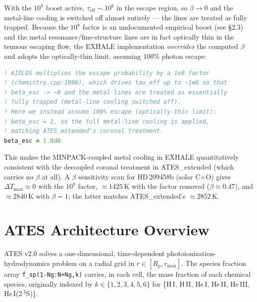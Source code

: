 \documentclass[english,a4paper]{my_memo}
\begin{document}
With the \(10^{8}\) boost active, \(\tau_\mathrm{eff}\sim 10^{6}\) in the
escape region, so \(\beta\to 0\) and the metal-line cooling is switched
off almost entirely --- the lines are treated as fully trapped.  Because
the \(10^{8}\) factor is an undocumented empirical boost (see \S2.3) and
the metal resonance/fine-structure lines are in fact optically thin in
the tenuous escaping flow, the EXHALE implementation
\emph{overrides} the computed \(\beta\) and adopts the optically-thin
limit, assuming 100\% photon escape:
\begin{lstlisting}[language=Fortran]
! AIOLOS multiplies the escape probability by a 1e8 factor
! (chemistry.cpp:1006), which drives tau_eff up to ~1e6 so that
! beta_esc -> ~0 and the metal lines are treated as essentially
! fully trapped (metal-line cooling switched off).
! Here we instead assume 100% escape (optically-thin limit):
! beta_esc = 1, so the full metal-line cooling is applied,
! matching ATES_extended's coronal treatment.
beta_esc = 1.0d0
\end{lstlisting}
This makes the MINPACK-coupled metal cooling in EXHALE
quantitatively consistent with the decoupled coronal treatment in
ATES\_extended (which carries no \(\beta\) at all).  A \(\beta\)
sensitivity scan for HD\,209458b (solar C+O) gives
\(\Delta T_\mathrm{max}\approx 0\) with the \(10^{8}\) factor,
\(\approx 1425\)\,K with the factor removed (\(\beta\approx 0.47\)), and
\(\approx 2840\)\,K with \(\beta = 1\); the latter matches
ATES\_extended's \(\approx 2852\)\,K.

\section{ATES Architecture Overview}

ATES v2.0 solves a one-dimensional, time-dependent
photoionization-hydrodynamics problem on a radial grid in
\(r \in [R_p, r_\mathrm{max}]\).  The species fraction array
\texttt{f\_sp(1-Ng:N+Ng,k)} carries, in each cell, the mass fraction of each
chemical species, originally indexed by
\(k \in \{1,2,3,4,5,6\}\) for
\{H\,I, H\,II, He\,I, He\,II, He\,III, He\,I(2\,\(^3\!\mathrm{S}\))\}.
\end{document}
